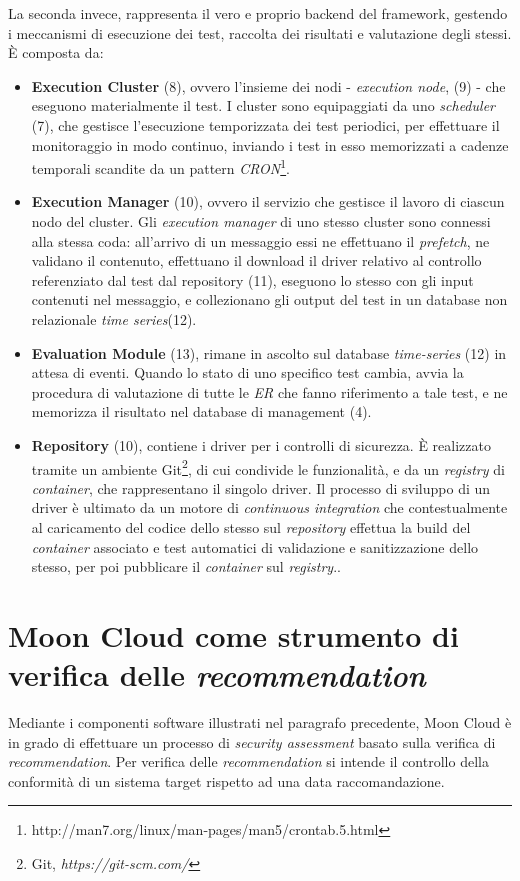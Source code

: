 \documentclass[../main.tex]{subfiles}
\begin{document}
La seconda invece, rappresenta il vero e proprio backend del framework, gestendo i meccanismi di esecuzione dei test, raccolta dei risultati e valutazione degli stessi.
È composta da:
\begin{itemize}
    \item \textbf{Execution Cluster} (8), ovvero l'insieme dei nodi - \textit{execution node}, (9)  - che eseguono materialmente il test. I cluster sono equipaggiati da uno \textit{scheduler} (7), che gestisce l'esecuzione temporizzata dei test periodici, per effettuare il monitoraggio in modo continuo, inviando i test in esso memorizzati a cadenze temporali scandite da un pattern \textit{CRON}\footnote{http://man7.org/linux/man-pages/man5/crontab.5.html}.
    \item \textbf{Execution Manager} (10), ovvero il servizio che gestisce il lavoro di ciascun nodo del cluster.        
        Gli \textit{execution manager} di uno stesso cluster sono connessi alla stessa coda: all'arrivo di un messaggio essi ne effettuano il \textit{prefetch}, ne validano il contenuto, effettuano il download il driver relativo al controllo referenziato dal test dal repository (11), eseguono lo stesso con gli input contenuti nel messaggio, e collezionano gli output del test in un database non relazionale \textit{time series}(12).
    \item \textbf{Evaluation Module} (13), rimane in ascolto sul database \textit{time-series} (12) in attesa di eventi. Quando lo stato di uno specifico test cambia, avvia la procedura di valutazione di tutte le \textit{ER} che fanno riferimento a tale test, e ne memorizza il risultato nel database di management (4).
    \item \textbf{Repository} (10), contiene i driver per i controlli di sicurezza. È realizzato tramite un ambiente Git\footnote{Git, \textit{https://git-scm.com/}}, di cui condivide le funzionalità, e da un \textit{registry} di \textit{container}, che rappresentano il singolo driver. Il processo di sviluppo di un driver è ultimato da un motore di \textit{continuous integration} che contestualmente al caricamento del codice dello stesso sul \textit{repository} effettua la build del \textit{container} associato e test automatici di validazione e sanitizzazione dello stesso, per poi pubblicare il \textit{container} sul \textit{registry}..
\end{itemize}
\section{Moon Cloud come strumento di verifica delle \textit{recommendation}}
Mediante i componenti software illustrati nel paragrafo precedente, Moon Cloud è in grado di effettuare un processo di \textit{security assessment} basato sulla verifica di \textit{recommendation}.
Per verifica delle \textit{recommendation} si intende il controllo  della conformità di un sistema target rispetto ad una data raccomandazione.
\end{document}
